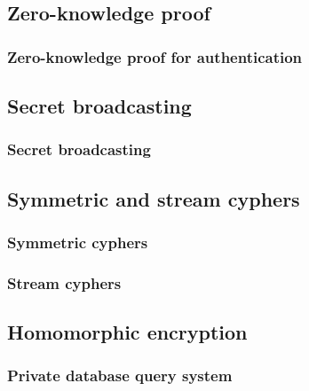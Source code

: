 \documentclass{beamer}
\begin{document}
\subsection{Zero-knowledge proof}

\begin{frame}
\frametitle{Zero-knowledge proof for authentication}
\end{frame}

\subsection{Secret broadcasting}

\begin{frame}
\frametitle{Secret broadcasting}
\end{frame}

\subsection{Symmetric and stream cyphers}

\begin{frame}
\frametitle{Symmetric cyphers}
\end{frame}

\begin{frame}
\frametitle{Stream cyphers}
\end{frame}

\subsection{Homomorphic encryption}

\begin{frame}
\frametitle{Private database query system}
\end{frame}
\end{document}
